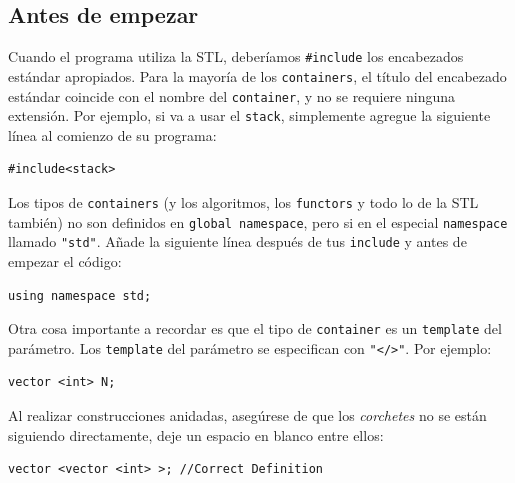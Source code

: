 \documentclass[a4paper,12pt]{article}
\begin{document}
\subsection*{Antes de empezar}
Cuando el programa utiliza la STL, deberíamos \texttt{\#include} los encabezados estándar apropiados. Para la mayoría de los \texttt{containers}, el título del encabezado estándar coincide con el nombre del \texttt{container}, y no se requiere ninguna extensión. Por ejemplo, si va a usar el \texttt{stack}, simplemente agregue la siguiente línea al comienzo de su programa:
\begin{lstlisting}
#include<stack>
\end{lstlisting}
Los  tipos de \texttt{containers} (y los algoritmos, los \texttt{functors} y todo lo de la STL también) no son definidos en \texttt{global namespace}, pero si en el especial \texttt{namespace} llamado \texttt{"std"}. Añade la siguiente línea después de tus \texttt{include} y antes de empezar el código:
\begin{lstlisting}
using namespace std;
\end{lstlisting} 
Otra cosa importante a recordar es que el tipo de \texttt{container} es un \texttt{template} del parámetro. Los \texttt{template} del parámetro se especifican con \texttt{"</>"}. Por ejemplo:
\begin{lstlisting}
vector <int> N;
\end{lstlisting}
Al realizar construcciones anidadas, asegúrese de que los \textit{corchetes} no se están siguiendo directamente, deje un espacio en blanco entre ellos:
\begin{lstlisting}
vector <vector <int> >; //Correct Definition
\end{lstlisting}
\end{document}
